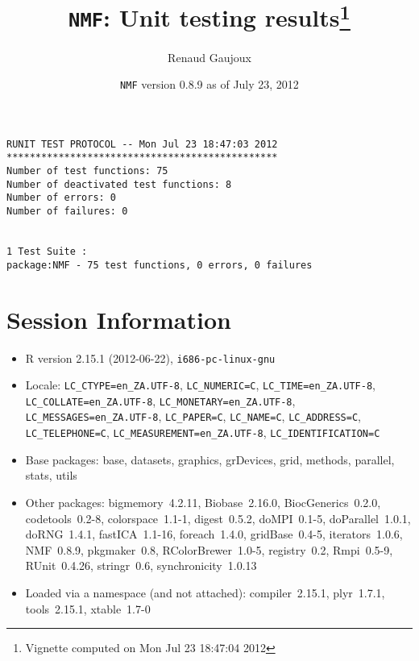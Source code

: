 \documentclass[10pt]{article}
\author{Renaud Gaujoux}
\title{\texttt{NMF}: Unit testing results\footnote{Vignette computed  on Mon Jul 23 18:47:04 2012}}
\date{\texttt{NMF} version 0.8.9 as of July 23, 2012}
\begin{document}
\maketitle

\begin{verbatim}
RUNIT TEST PROTOCOL -- Mon Jul 23 18:47:03 2012 
*********************************************** 
Number of test functions: 75 
Number of deactivated test functions: 8 
Number of errors: 0 
Number of failures: 0 

 
1 Test Suite : 
package:NMF - 75 test functions, 0 errors, 0 failures
\end{verbatim}

\section*{Session Information}
\begin{itemize}\raggedright
  \item R version 2.15.1 (2012-06-22), \verb|i686-pc-linux-gnu|
  \item Locale: \verb|LC_CTYPE=en_ZA.UTF-8|, \verb|LC_NUMERIC=C|, \verb|LC_TIME=en_ZA.UTF-8|, \verb|LC_COLLATE=en_ZA.UTF-8|, \verb|LC_MONETARY=en_ZA.UTF-8|, \verb|LC_MESSAGES=en_ZA.UTF-8|, \verb|LC_PAPER=C|, \verb|LC_NAME=C|, \verb|LC_ADDRESS=C|, \verb|LC_TELEPHONE=C|, \verb|LC_MEASUREMENT=en_ZA.UTF-8|, \verb|LC_IDENTIFICATION=C|
  \item Base packages: base, datasets, graphics, grDevices, grid,
    methods, parallel, stats, utils
  \item Other packages: bigmemory~4.2.11, Biobase~2.16.0,
    BiocGenerics~0.2.0, codetools~0.2-8, colorspace~1.1-1,
    digest~0.5.2, doMPI~0.1-5, doParallel~1.0.1, doRNG~1.4.1,
    fastICA~1.1-16, foreach~1.4.0, gridBase~0.4-5, iterators~1.0.6,
    NMF~0.8.9, pkgmaker~0.8, RColorBrewer~1.0-5, registry~0.2,
    Rmpi~0.5-9, RUnit~0.4.26, stringr~0.6, synchronicity~1.0.13
  \item Loaded via a namespace (and not attached): compiler~2.15.1,
    plyr~1.7.1, tools~2.15.1, xtable~1.7-0
\end{itemize}
\end{document}
